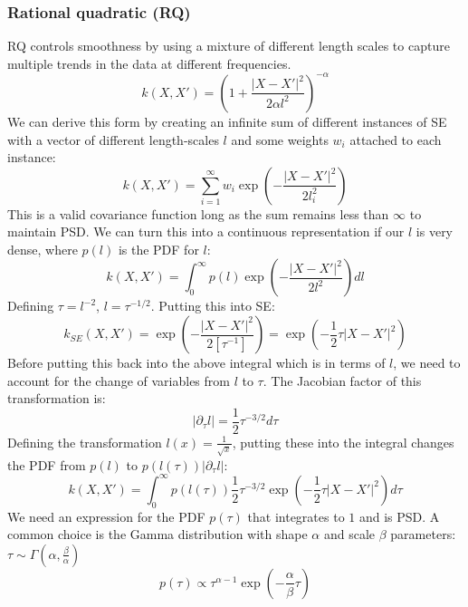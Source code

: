 \subsubsection{Rational quadratic (RQ)}
RQ controls smoothness by using a mixture of different length scales to capture multiple trends in the data at different frequencies. 
\begin{equation*}
    k(X,X') = \left( 1 + \frac{|X - X'|^2}{2\alpha l^2} \right)^{-\alpha}
\end{equation*}
We can derive this form by creating an infinite sum of different instances of SE with a vector of different length-scales $l$ and some weights $w_i$ attached to each instance:
\begin{equation*}
    k(X,X') = \sum_{i=1}^{\infty} w_i \exp \left( -\frac{|X - X'|^2}{2l_i^2} \right)
\end{equation*}
This is a valid covariance function long as the sum remains less than $\infty$ to maintain PSD. We can turn this into a continuous representation if our $l$ is very dense, where $p(l)$ is the PDF for $l$:
\begin{equation*}
    k(X,X') = \int_{0}^{\infty} p(l) \exp \left( -\frac{|X - X'|^2}{2l^2} \right) dl
\end{equation*}
Defining $\tau= l^{-2}$, $l = \tau^{-1/2}$. Putting this into SE:
\begin{equation*}
    k_{SE}(X,X') = \exp(-\frac{|X - X'|^2}{2[\tau^{-1}]}) = \exp(-\frac{1}{2} \tau |X - X'|^2)
\end{equation*}
Before putting this back into the above integral which is in terms of $l$, we need to account for the change of variables from $l$ to $\tau$. The Jacobian factor of this transformation is:
\begin{equation*}
    | \partial_{\tau} l | = \frac{1}{2} \tau^{-3/2} d\tau
\end{equation*}
Defining the transformation $l(x) = \frac{1}{\sqrt{x}}$, putting these into the integral changes the PDF from $p(l)$ to $p(l(\tau)) | \partial_{\tau}l |$:
\begin{equation*}
    k(X,X') = \int_{0}^{\infty} p(l(\tau)) \frac{1}{2} \tau^{-3/2} \exp \left( -\frac{1}{2} \tau |X - X'|^2 \right) d\tau
\end{equation*}
We need an expression for the PDF $p(\tau)$ that integrates to $1$ and is PSD. A common choice is the Gamma distribution with shape $\alpha$ and scale $\beta$ parameters: $\tau \sim \Gamma(\alpha, \frac{\beta}{\alpha})$ 
\begin{equation*}
    p(\tau) \propto \tau ^{\alpha - 1} \exp \left( - \frac{\alpha}{\beta} \tau \right)
\end{equation*}
